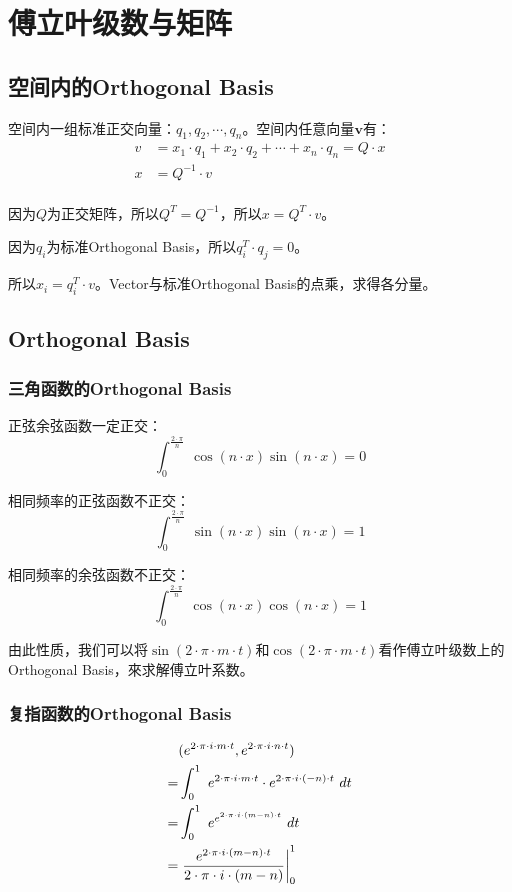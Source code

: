 \section{傅立叶级数与矩阵}
\subsection{空间内的Orthogonal Basis}
空间内一组标准正交向量：$q_1,q_2,\cdots ,q_n$。空间内任意向量$\mathbf{v}$有：
\begin{align*}
	v & =x_1\cdot q_1+x_2\cdot q_2+\cdots+x_n\cdot q_n=Q\cdot x \\
	x & =Q^{-1}\cdot v                                          \\
\end{align*}

因为$Q$为正交矩阵，所以$Q^T=Q^{-1}$，所以$x=Q^T\cdot v$。

因为$q_i$为标准Orthogonal Basis，所以$q_i^T\cdot q_j=0$。

所以$x_i=q_i^T\cdot v$。Vector与标准Orthogonal Basis的点乘，求得各分量。
\subsection{Orthogonal Basis}
\subsubsection{三角函数的Orthogonal Basis}
正弦余弦函数一定正交：
$$
	\int_0^{\frac{2\cdot \pi}{n}}\ \cos(n\cdot x)\sin(n\cdot x)=0
$$

相同频率的正弦函数不正交：
$$
	\int_0^{\frac{2\cdot \pi}{n}}\ \sin(n\cdot x)\sin(n\cdot x)=1
$$

相同频率的余弦函数不正交：
$$
	\int_0^{\frac{2\cdot \pi}{n}}\ \cos(n\cdot x)\cos(n\cdot x)=1
$$

由此性质，我们可以将$\sin(2\cdot \pi\cdot m \cdot t)$和$\cos(2\cdot \pi\cdot m \cdot t)$看作傅立叶级数上的Orthogonal Basis，來求解傅立叶系数。
\subsubsection{复指函数的Orthogonal Basis}
\begin{align*}
	  & (e^{2\cdot \pi\cdot i\cdot m\cdot t},e^{2\cdot \pi\cdot i\cdot n\cdot t})                      \\
	= & \int_0^1 \ e^{2\cdot \pi\cdot i\cdot m\cdot t}\cdot e^{2\cdot \pi\cdot i\cdot (-n)\cdot t}\ dt \\
	= & \int_0^1 \ e^{e^{2\cdot \pi\cdot i\cdot (m-n)\cdot t}}\ dt                                     \\
	= & \rsx{\frac{e^{2\cdot \pi\cdot i\cdot (m-n)\cdot t}}{2\cdot \pi \cdot i \cdot(m-n)}}_0^1
\end{align*}


